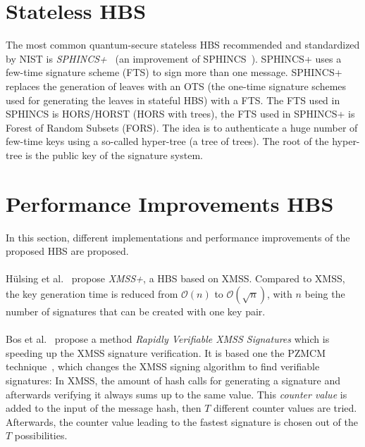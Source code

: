 \section{Stateless HBS}
The most common quantum-secure stateless HBS recommended and standardized by NIST is \textit{SPHINCS+}~\cite{tweakable_basispaper_sphincs_2019} (an improvement of SPHINCS~\cite{sphincs_old_version_2015}).
SPHINCS+ uses a few-time signature scheme (FTS) to sign more than one message.
SPHINCS+ replaces the generation of leaves with an OTS (the one-time signature schemes used for generating the leaves in stateful HBS) with a FTS.
The FTS used in SPHINCS is HORS/HORST (HORS with trees), the FTS used in SPHINCS+ is Forest of Random Subsets (FORS). The idea is to authenticate a huge number of few-time keys using a so-called hyper-tree (a tree of trees). The root of the hyper-tree is the public key of the signature system.
~\cite{tweakable_basispaper_sphincs_2019,sphincs+_submission_nist_round2}

\section{Performance Improvements HBS}
In this section, different implementations and performance improvements of the proposed HBS are proposed.
\\ \\
Hülsing et al.~\cite{xmss+_2018} propose \textit{XMSS+}, a HBS based on XMSS. Compared to XMSS, the key generation time is reduced from $\mathcal{O}(n)$ to $\mathcal{O}(\sqrt{n})$, with $n$ being the number of signatures that can be created with one key pair.
\\ \\
Bos et al.~\cite{xmss_rapidly_verif_sign_2020} propose a method \textit{Rapidly Verifiable XMSS Signatures} which is speeding up the XMSS signature verification. It is based one the PZMCM technique~\cite{PZMCM_speedup_wots_2018}, which changes the XMSS signing algorithm to find verifiable signatures: In XMSS, the amount of hash calls for generating a signature and afterwards verifying it always sums up to the same value. This \textit{counter value} is added to the input of the message hash, then $T$ different counter values are tried. Afterwards, the counter value leading to the fastest signature is chosen out of the $T$ possibilities.


